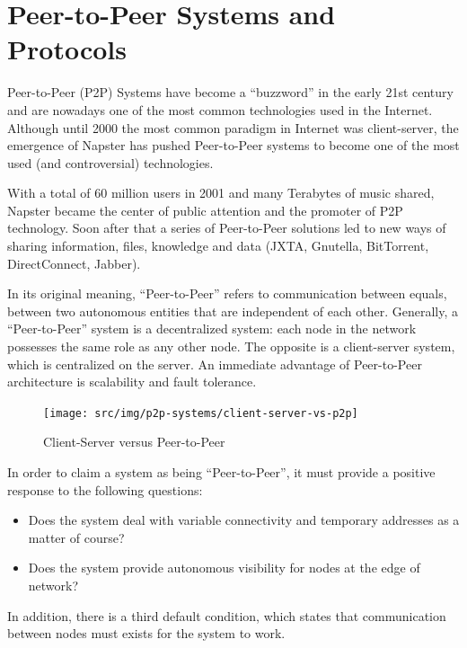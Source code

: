 
\chapter{Peer-to-Peer Systems and Protocols}
\label{chapter:p2p-systems}

Peer-to-Peer (P2P) Systems have become a ``buzzword'' in the early 21st
century and are nowadays one of the most common technologies used in the
Internet. Although until 2000 the most common paradigm in Internet was
client-server, the emergence of Napster has pushed Peer-to-Peer systems
to become one of the most used (and controversial) technologies.

With a total of 60 million users in 2001 and many Terabytes of music shared,
Napster became the center of public attention and the promoter of P2P
technology. Soon after that a series of Peer-to-Peer solutions led to new
ways of sharing information, files, knowledge and data (JXTA, Gnutella,
BitTorrent, DirectConnect, Jabber).

In its original meaning, ``Peer-to-Peer'' refers to communication between
equals, between two autonomous entities that are independent of each other.
Generally, a ``Peer-to-Peer'' system is a decentralized system: each node in
the network possesses the same role as any other node. The opposite is a
client-server system, which is centralized on the server. An immediate
advantage of Peer-to-Peer architecture is scalability and fault tolerance.

\begin{figure}
  \centering
  \texttt{[image: src/img/p2p-systems/client-server-vs-p2p]}
  \caption{Client-Server versus Peer-to-Peer}
  \label{fig:p2p-systems:client-server-vs-p2p}
\end{figure}

In order to claim a system as being ``Peer-to-Peer'', it must provide a
positive response to the following questions:
\begin{itemize}
  \item Does the system deal with variable connectivity and temporary
  addresses as a matter of course?
  \item Does the system provide autonomous visibility for nodes at the edge of
  network?
\end{itemize}

In addition, there is a third default condition, which states that
communication between nodes must exists for the system to work.


